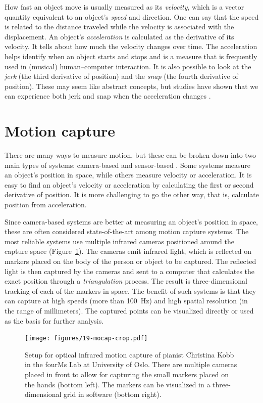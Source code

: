 How fast an object move is usually measured as its \emph{velocity}, which is a vector quantity equivalent to an object's \emph{speed} and direction. One can say that the speed is related to the distance traveled while the velocity is associated with the displacement. An object's \emph{acceleration} is calculated as the derivative of its velocity. It tells about how much the velocity changes over time. The acceleration helps identify when an object starts and stops and is a measure that is frequently used in (musical) human--computer interaction. It is also possible to look at the \emph{jerk} (the third derivative of position) and the \emph{snap} (the fourth derivative of position). These may seem like abstract concepts, but studies have shown that we can experience both jerk and snap when the acceleration changes \citep{eager_beyond_2016}.


\section{Motion capture}\label{sec:motion-capture}

There are many ways to measure motion, but these can be broken down into two main types of systems: camera-based and sensor-based \citep{jensenius_methods_2018}. Some systems measure an object's position in space, while others measure velocity or acceleration. It is easy to find an object's velocity or acceleration by calculating the first or second derivative of position. It is more challenging to go the other way, that is, calculate position from acceleration.

Since camera-based systems are better at measuring an object's position in space, these are often considered state-of-the-art among motion capture systems. The most reliable systems use multiple infrared cameras positioned around the capture space (Figure~\ref{fig:christina}). The cameras emit infrared light, which is reflected on markers placed on the body of the person or object to be captured. The reflected light is then captured by the cameras and sent to a computer that calculates the exact position through a \emph{triangulation} process. The result is three-dimensional tracking of each of the markers in space. The benefit of such systems is that they can capture at high speeds (more than 100~Hz) and high spatial resolution (in the range of millimeters). The captured points can be visualized directly or used as the basis for further analysis.

\begin{figure}[tbp]
	\centerline{
	\texttt{[image: figures/19-mocap-crop.pdf]}}
	\caption{Setup for optical infrared motion capture of pianist Christina Kobb in the fourMs Lab at University of Oslo. There are multiple cameras placed in front to allow for capturing the small markers placed on the hands (bottom left). The markers can be visualized in a three-dimensional grid in software (bottom right).}
	\label{fig:christina}
\end{figure}

